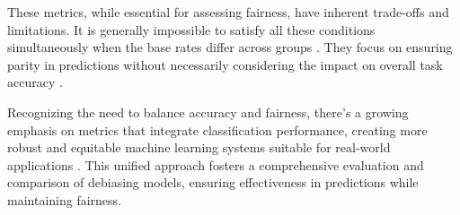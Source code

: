 These metrics, while essential for assessing fairness, have inherent trade-offs and limitations. It is generally impossible to satisfy all these conditions simultaneously when the base rates differ across groups \cite{chouldechova2017}. They focus on ensuring parity in predictions without necessarily considering the impact on overall task accuracy \cite{dwork2012,hardt2016equality}.




Recognizing the need to balance accuracy and fairness, there's a growing emphasis on metrics that integrate classification performance, creating more robust and equitable machine learning systems suitable for real-world applications \cite{grgichlaca2018}. This unified approach fosters a comprehensive evaluation and comparison of debiasing models, ensuring effectiveness in predictions while maintaining fairness.


